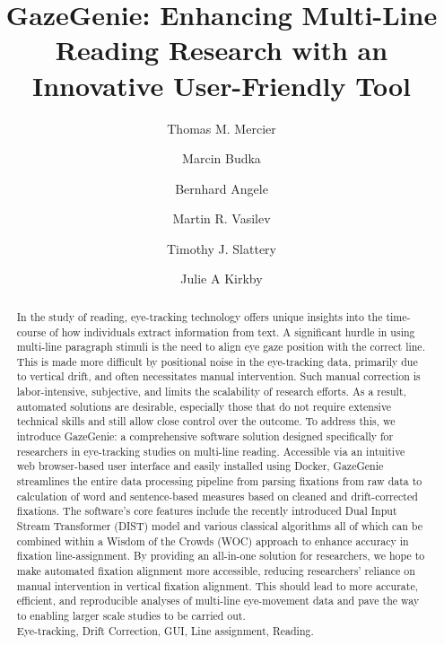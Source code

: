 \documentclass[twocolumn]{article}
\begin{document}
\onecolumn
\title{GazeGenie: Enhancing Multi-Line Reading Research with an Innovative User-Friendly Tool}
\date{}

\author[1]{\small Thomas M. Mercier}
\author[2]{\small Marcin Budka}
\author[1,3]{\small Bernhard Angele}
\author[4]{\small Martin R. Vasilev}
\author[1]{\small Timothy J. Slattery}
\author[1]{\small Julie A Kirkby}


\maketitle


\begin{abstract}
\noindent  In the study of reading, eye-tracking technology offers unique insights into the time-course of how individuals extract information from text. A significant hurdle in using multi-line paragraph stimuli is the need to align eye gaze position with the correct line. This is made more difficult by positional noise in the eye-tracking data, primarily due to vertical drift, and often necessitates manual intervention. Such manual correction is labor-intensive, subjective, and limits the scalability of research efforts. As a result, automated solutions are desirable, especially those that do not require extensive technical skills and still allow close control over the outcome. To address this, we introduce GazeGenie: a comprehensive software solution designed specifically for researchers in eye-tracking studies on multi-line reading. Accessible via an intuitive web browser-based user interface and easily installed using Docker, GazeGenie streamlines the entire data processing pipeline from parsing fixations from raw data to calculation of word and sentence-based measures based on cleaned and drift-corrected fixations. The software's core features include the recently introduced Dual Input Stream Transformer (DIST) model and various classical algorithms all of which can be combined within a Wisdom of the Crowds (WOC) approach to enhance accuracy in fixation line-assignment. By providing an all-in-one solution for researchers, we hope to make automated fixation alignment more accessible, reducing researchers' reliance on manual intervention in vertical fixation alignment. This should lead to more accurate, efficient, and reproducible analyses of multi-line eye-movement data and pave the way to enabling larger scale studies to be carried out. \\


 Eye-tracking, Drift Correction, GUI, Line assignment, Reading.   
\end{abstract}
\end{document}
